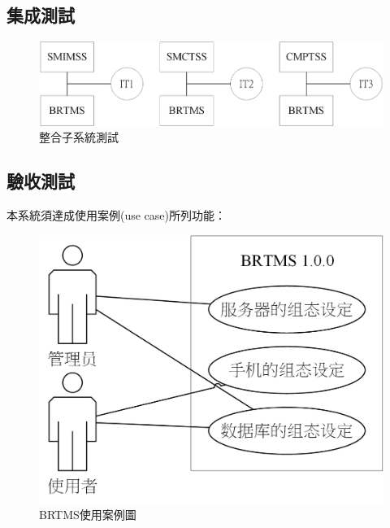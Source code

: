  		\subsection{集成測試}
 			\begin{figure}[h]
				\centering
				\includegraphics[width = 1\textwidth]{IntegrationTesting.png}
				\caption{整合子系統測試}\label{IntegrationTesting}
			\end{figure}

		\subsection{驗收測試}
		本系統須達成使用案例(use case)所列功能：
			\begin{figure}[h]
				\centering
				\includegraphics[width = 1\textwidth]{usecasediagram.png}
				\caption{BRTMS使用案例圖}\label{usecasediagram}
			\end{figure}



